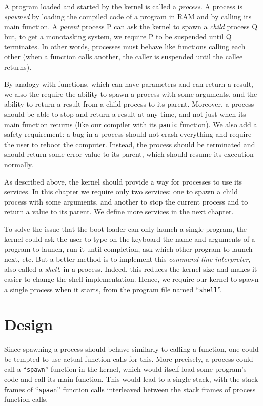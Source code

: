 A program loaded and started by the kernel is called a {\em process}. A process
is {\em spawned} by loading the compiled code of a program in RAM and by
calling its main function. A {\em parent} process P can ask the kernel to spawn
a {\em child} process Q but, to get a monotasking system, we require P to be
suspended until Q terminates. In other words, processes must behave like
functions calling each other (when a function calls another, the caller is
suspended until the callee returns).

By analogy with functions, which can have parameters and can return a result,
we also the require the ability to spawn a process with some arguments, and the
ability to return a result from a child process to its parent. Moreover, a
process should be able to stop and return a result at any time, and not just
when its main function returns (like our compiler with its {\tt panic}
function). We also add a safety requirement: a bug in a process should not
crash everything and require the user to reboot the computer. Instead, the
process should be terminated and should return some error value to its parent,
which should resume its execution normally.

As described above, the kernel should provide a way for processes to use its
services. In this chapter we require only two services: one to spawn a child
process with some arguments, and another to stop the current process and to
return a value to its parent. We define more services in the next chapter.

To solve the issue that the boot loader can only launch a single program, the
kernel could ask the user to type on the keyboard the name and arguments of a
program to launch, run it until completion, ask which other program to launch
next, etc. But a better method is to implement this {\em command line
interpreter}, also called a {\em shell}, in a process. Indeed, this reduces
the kernel size and makes it easier to change the shell implementation. Hence,
we require our kernel to spawn a single process when it starts, from the
program file named ``{\tt shell}''.

\section{Design}\label{subsection:process-design}

Since spawning a process should behave similarly to calling a function, one
could be tempted to use actual function calls for this. More precisely, a
process could call a ``{\tt spawn}'' function in the kernel, which would itself
load some program's code and call its main function. This would lead to a
single stack, with the stack frames of ``{\tt spawn}'' function calls
interleaved between the stack frames of process function calls.

